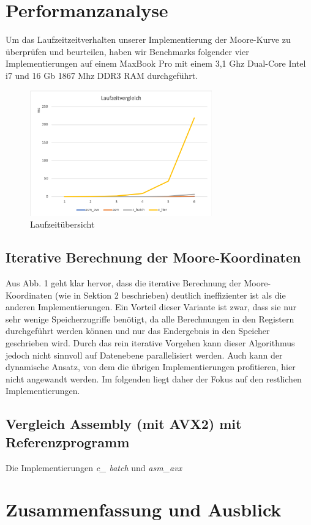 \documentclass[course=erap]{aspdoc}
\begin{document}
\section{Performanzanalyse}
Um das Laufzeitzeitverhalten unserer Implementierung der Moore-Kurve zu überprüfen und beurteilen, haben wir Benchmarks folgender vier Implementierungen auf einem MaxBook Pro mit einem 3,1 Ghz Dual-Core Intel i7 und 16 Gb 1867 Mhz DDR3 RAM durchgeführt.


\begin{figure}[htbp] 
  \centering
     \includegraphics[width=0.7\textwidth]{media/laufzeitvergleich_1_bis_6.png}
  \caption{Laufzeitübersicht}
  \label{fig:Bild1}
 \end{figure}
 
 \subsection{Iterative Berechnung der Moore-Koordinaten}
Aus Abb. 1 geht klar hervor, dass die iterative Berechnung der Moore-Koordinaten (wie in Sektion 2 beschrieben) deutlich ineffizienter ist als die anderen Implementierungen. Ein Vorteil dieser Variante ist zwar, dass sie nur sehr wenige Speicherzugriffe benötigt, da alle Berechnungen in den Registern durchgeführt werden können und nur das Endergebnis in den Speicher geschrieben wird. Durch das rein iterative Vorgehen kann dieser Algorithmus jedoch nicht sinnvoll auf Datenebene parallelisiert werden. Auch kann der dynamische Ansatz, von dem die übrigen Implementierungen profitieren, hier nicht angewandt werden. Im folgenden liegt daher der Fokus auf den restlichen Implementierungen.

\subsection{Vergleich Assembly (mit AVX2) mit Referenzprogramm}
Die Implementierungen \textit{c\_ batch} und \textit{asm\_avx}




\section{Zusammenfassung und Ausblick}


{}
\end{document}
